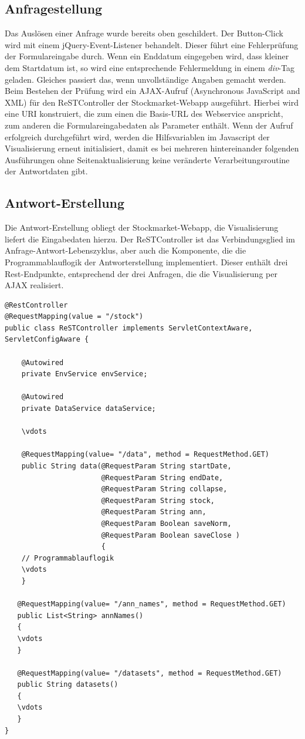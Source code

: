 \subsection{Anfragestellung}
Das Auslösen einer Anfrage wurde bereits oben geschildert. Der Button-Click wird mit einem jQuery-Event-Listener behandelt. Dieser führt eine Fehlerprüfung der Formulareingabe durch. Wenn ein Enddatum eingegeben wird, dass kleiner dem Startdatum ist, so wird eine entsprechende Fehlermeldung in einem \emph{div}-Tag geladen. Gleiches passiert das, wenn unvollständige Angaben gemacht werden.\\
Beim Bestehen der Prüfung wird ein AJAX-Aufruf (Asynchronous JavaScript and XML) für den ReSTController der Stockmarket-Webapp ausgeführt. Hierbei wird eine URI konstruiert, die zum einen die Basis-URL des Webservice anspricht, zum anderen die  Formulareingabedaten als Parameter enthält. Wenn der Aufruf erfolgreich durchgeführt wird, werden die Hilfsvariablen im Javascript der Visualisierung erneut initialisiert, damit es bei mehreren hintereinander folgenden Ausführungen ohne Seitenaktualisierung keine veränderte Verarbeitungsroutine der Antwortdaten gibt.

\subsection{Antwort-Erstellung}
Die Antwort-Erstellung obliegt der Stockmarket-Webapp, die Visualisierung liefert die Eingabedaten hierzu. Der ReSTController ist das Verbindungsglied im Anfrage-Antwort-Lebenszyklus, aber auch die Komponente, die die Programmablauflogik der Antworterstellung implementiert. Dieser enthält drei Rest-Endpunkte, entsprechend der drei Anfragen, die die Visualisierung per AJAX realisiert.\\

\begin{lstlisting}[basicstyle=\scriptsize, caption=ReSTController Snippet]
@RestController
@RequestMapping(value = "/stock")
public class ReSTController implements ServletContextAware, ServletConfigAware {

    @Autowired
    private EnvService envService;

    @Autowired
    private DataService dataService;
    
    \vdots
    
    @RequestMapping(value= "/data", method = RequestMethod.GET)
    public String data(@RequestParam String startDate,
                       @RequestParam String endDate,
                       @RequestParam String collapse,
                       @RequestParam String stock,
                       @RequestParam String ann,
                       @RequestParam Boolean saveNorm,
                       @RequestParam Boolean saveClose ) 
                       {
	// Programmablauflogik
	\vdots
	}

   @RequestMapping(value= "/ann_names", method = RequestMethod.GET)
   public List<String> annNames()
   {    
   \vdots
   }
    
   @RequestMapping(value= "/datasets", method = RequestMethod.GET)
   public String datasets() 
   {
   \vdots
   }
}    
    
\end{lstlisting}   

